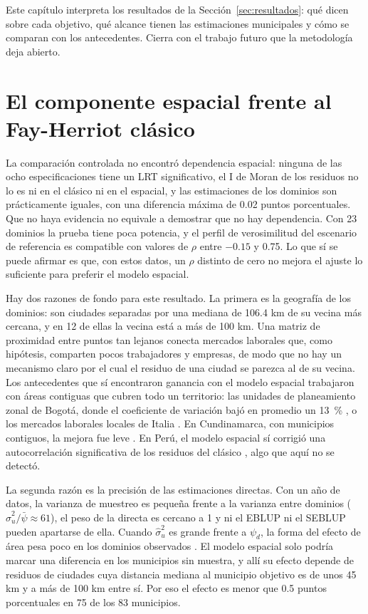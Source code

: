 
\label{sec:discusion}

Este capítulo interpreta los resultados de la Sección~\ref{sec:resultados}: qué dicen sobre cada objetivo, qué alcance tienen las estimaciones municipales y cómo se comparan con los antecedentes. Cierra con el trabajo futuro que la metodología deja abierto.

\section{El componente espacial frente al Fay-Herriot clásico}
\label{sec:dis_espacial}

La comparación controlada no encontró dependencia espacial: ninguna de las ocho especificaciones tiene un LRT significativo, el I de Moran de los residuos no lo es ni en el clásico ni en el espacial, y las estimaciones de los dominios son prácticamente iguales, con una diferencia máxima de 0.02 puntos porcentuales. Que no haya evidencia no equivale a demostrar que no hay dependencia. Con 23 dominios la prueba tiene poca potencia, y el perfil de verosimilitud del escenario de referencia es compatible con valores de $\rho$ entre $-0.15$ y 0.75. Lo que sí se puede afirmar es que, con estos datos, un $\rho$ distinto de cero no mejora el ajuste lo suficiente para preferir el modelo espacial.

Hay dos razones de fondo para este resultado. La primera es la geografía de los dominios: son ciudades separadas por una mediana de 106.4 km de su vecina más cercana, y en 12 de ellas la vecina está a más de 100 km. Una matriz de proximidad entre puntos tan lejanos conecta mercados laborales que, como hipótesis, comparten pocos trabajadores y empresas, de modo que no hay un mecanismo claro por el cual el residuo de una ciudad se parezca al de su vecina. Los antecedentes que sí encontraron ganancia con el modelo espacial trabajaron con áreas contiguas que cubren todo un territorio: las unidades de planeamiento zonal de Bogotá, donde el coeficiente de variación bajó en promedio un 13~\% \cite[p.~14]{VargasLemusAlejo2018}, o los mercados laborales locales de Italia \cite[pp.~140--142]{Benedetti2024}. En Cundinamarca, con municipios contiguos, la mejora fue leve \cite[p.~13]{MendozaZea2019}. En Perú, el modelo espacial sí corrigió una autocorrelación significativa de los residuos del clásico \cite[p.~194]{Sikov2023}, algo que aquí no se detectó.

La segunda razón es la precisión de las estimaciones directas. Con un año de datos, la varianza de muestreo es pequeña frente a la varianza entre dominios ($\hat{\sigma}_u^2/\bar{\psi} \approx 61$), el peso de la directa es cercano a 1 y ni el EBLUP ni el SEBLUP pueden apartarse de ella. Cuando $\hat{\sigma}_u^2$ es grande frente a $\psi_d$, la forma del efecto de área pesa poco en los dominios observados \cite[p.~143]{Benedetti2024}. El modelo espacial solo podría marcar una diferencia en los municipios sin muestra, y allí su efecto depende de residuos de ciudades cuya distancia mediana al municipio objetivo es de unos 45 km y a más de 100 km entre sí. Por eso el efecto es menor que 0.5 puntos porcentuales en 75 de los 83 municipios.


